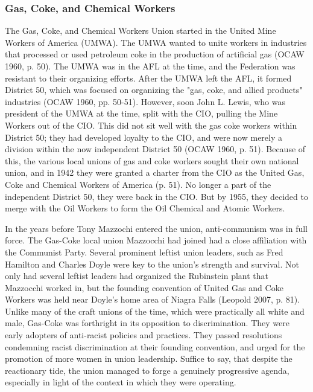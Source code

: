 \documentclass[12pt]{article}
\begin{document}
\subsubsection{Gas, Coke, and Chemical Workers}

The Gas, Coke, and Chemical Workers Union started in the United Mine Workers of America (UMWA). The UMWA wanted to unite workers in industries that processed or used petroleum coke in the production of artificial gas (OCAW 1960, p. 50). The UMWA was in the AFL at the time, and the Federation was resistant to their organizing efforts. After the UMWA left the AFL, it formed District 50, which was focused on organizing the "gas, coke, and allied products" industries (OCAW 1960, pp. 50-51). However, soon John L. Lewis, who was president of the UMWA at the time, split with the CIO, pulling the Mine Workers out of the CIO. This did not sit well with the gas coke workers within District 50; they had developed loyalty to the CIO, and were now merely a division within the now independent District 50 (OCAW 1960, p. 51). Because of this, the various local unions of gas and coke workers sought their own national union, and in 1942 they were granted a charter from the CIO as the United Gas, Coke and Chemical Workers of America (p. 51). No longer a part of the independent District 50, they were back in the CIO.  But by 1955, they decided to merge with the Oil Workers to form the Oil Chemical and Atomic Workers.

In the years before Tony Mazzochi entered the union, anti-communism was in full force. The Gas-Coke local union Mazzocchi had joined had a close affiliation with the Communist Party. Several prominent leftist union leaders, such as Fred Hamilton and Charles Doyle were key to the union’s strength and survival. Not only had several leftist leaders had organized the Rubinstein plant that Mazzocchi worked in, but the founding convention of United Gas and Coke Workers was held near Doyle’s home area of Niagra Falls (Leopold 2007, p. 81). Unlike many of the craft unions of the time, which were practically all white and male, Gas-Coke was forthright in its opposition to discrimination. They were early adopters of anti-racist policies and practices. They passed resolutions condemning racist discrimination at their founding convention, and urged for the promotion of more women in union leadership. Suffice to say, that despite the reactionary tide, the union managed to forge a genuinely progressive agenda, especially in light of the context in which they were operating.
\end{document}
